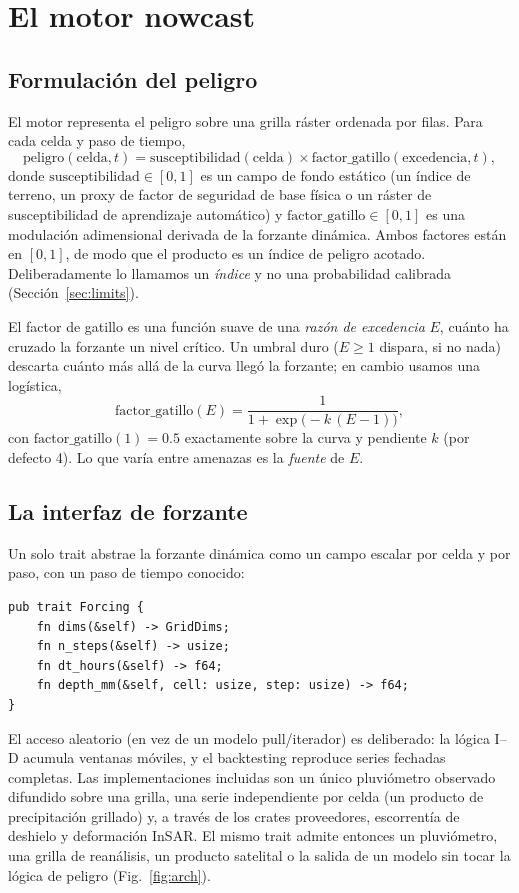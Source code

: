 \documentclass[authoryear,preprint,review,12pt]{elsarticle}
\begin{document}
\section{El motor nowcast}

\subsection{Formulación del peligro}

El motor representa el peligro sobre una grilla ráster ordenada por filas. Para
cada celda y paso de tiempo,
\begin{equation}
\mathrm{peligro}(\mathrm{celda},t)=\mathrm{susceptibilidad}(\mathrm{celda})\times
\mathrm{factor\_gatillo}(\mathrm{excedencia},t),
\label{eq:hazard}
\end{equation}
donde $\mathrm{susceptibilidad}\in[0,1]$ es un campo de fondo estático (un índice
de terreno, un proxy de factor de seguridad de base física o un ráster de
susceptibilidad de aprendizaje automático) y $\mathrm{factor\_gatillo}\in[0,1]$ es
una modulación adimensional derivada de la forzante dinámica. Ambos factores están
en $[0,1]$, de modo que el producto es un índice de peligro acotado.
Deliberadamente lo llamamos un \emph{índice} y no una probabilidad calibrada
(Sección~\ref{sec:limits}).

El factor de gatillo es una función suave de una \emph{razón de excedencia} $E$,
cuánto ha cruzado la forzante un nivel crítico. Un umbral duro ($E\geq 1$ dispara,
si no nada) descarta cuánto más allá de la curva llegó la forzante; en cambio
usamos una logística,
\begin{equation}
\mathrm{factor\_gatillo}(E)=\frac{1}{1+\exp\!\big(-k\,(E-1)\big)},
\label{eq:logistic}
\end{equation}
con $\mathrm{factor\_gatillo}(1)=0.5$ exactamente sobre la curva y pendiente $k$
(por defecto 4). Lo que varía entre amenazas es la \emph{fuente} de $E$.

\subsection{La interfaz de forzante}

Un solo trait abstrae la forzante dinámica como un campo escalar por celda y por
paso, con un paso de tiempo conocido:
\begin{verbatim}
pub trait Forcing {
    fn dims(&self) -> GridDims;
    fn n_steps(&self) -> usize;
    fn dt_hours(&self) -> f64;
    fn depth_mm(&self, cell: usize, step: usize) -> f64;
}
\end{verbatim}
El acceso aleatorio (en vez de un modelo pull/iterador) es deliberado: la lógica
I--D acumula ventanas móviles, y el backtesting reproduce series fechadas
completas. Las implementaciones incluidas son un único pluviómetro observado
difundido sobre una grilla, una serie independiente por celda (un producto de
precipitación grillado) y, a través de los crates proveedores, escorrentía de
deshielo y deformación InSAR. El mismo trait admite entonces un pluviómetro, una
grilla de reanálisis, un producto satelital o la salida de un modelo sin tocar la
lógica de peligro (Fig.~\ref{fig:arch}).
\end{document}
